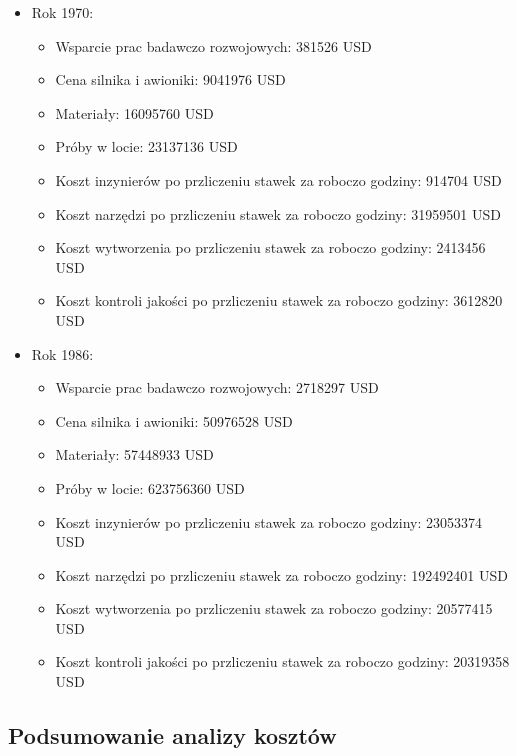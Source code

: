         \begin{itemize}
            \item Rok 1970:
                \begin{itemize}
                    \item Wsparcie prac badawczo rozwojowych: 381526 USD
                    \item Cena silnika i awioniki: 9041976 USD
                    \item Materiały: 16095760 USD
                    \item Próby w locie: 23137136 USD
                    \item Koszt inzynierów po przliczeniu stawek za roboczo godziny: 914704 USD
                    \item Koszt narzędzi po przliczeniu stawek za roboczo godziny: 31959501 USD
                    \item Koszt wytworzenia po przliczeniu stawek za roboczo godziny: 2413456 USD
                    \item Koszt kontroli jakości po przliczeniu stawek za roboczo godziny: 3612820 USD
                \end{itemize}
            \item Rok 1986:
                \begin{itemize}
                    \item Wsparcie prac badawczo rozwojowych: 2718297 USD
                    \item Cena silnika i awioniki: 50976528 USD
                    \item Materiały: 57448933 USD
                    \item Próby w locie: 623756360 USD
                    \item Koszt inzynierów po przliczeniu stawek za roboczo godziny: 23053374 USD
                    \item Koszt narzędzi po przliczeniu stawek za roboczo godziny: 192492401 USD
                    \item Koszt wytworzenia po przliczeniu stawek za roboczo godziny: 20577415 USD
                    \item Koszt kontroli jakości po przliczeniu stawek za roboczo godziny: 20319358 USD
                \end{itemize}
        \end{itemize}

    \subsection{Podsumowanie analizy kosztów}

